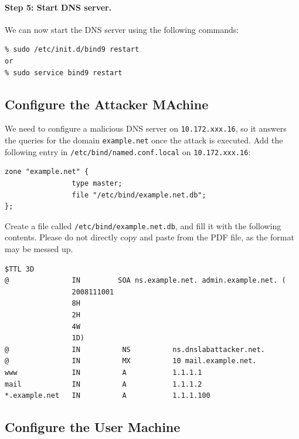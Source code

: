 
\paragraph{Step 5: Start DNS server.}
We can now start the DNS server using the following commands:

\begin{verbatim}
% sudo /etc/init.d/bind9 restart
or
% sudo service bind9 restart
\end{verbatim}

\subsection{Configure the Attacker MAchine}
We need to configure a malicious DNS server on {\tt 10.172.xxx.16}, so it answers the 
queries for the domain {\tt example.net} once the attack is executed.  Add the following 
entry in {\tt /etc/bind/named.conf.local} on {\tt 10.172.xxx.16}:

\begin{verbatim}
zone "example.net" {
                type master;
                file "/etc/bind/example.net.db";
};
\end{verbatim}

Create a file called {\tt /etc/bind/example.net.db}, and fill it with
the following contents. Please do not directly copy and paste
from the PDF file, as the format may be messed up.

\begin{verbatim}
$TTL 3D
@               IN         SOA ns.example.net. admin.example.net. (
                2008111001
                8H
                2H
                4W
                1D)	
@               IN          NS          ns.dnslabattacker.net.
@               IN          MX          10 mail.example.net.
www             IN          A           1.1.1.1	
mail            IN          A           1.1.1.2
*.example.net   IN          A           1.1.1.100
\end{verbatim}



\subsection{Configure the User Machine} 
\label{subsec:user_machine}

